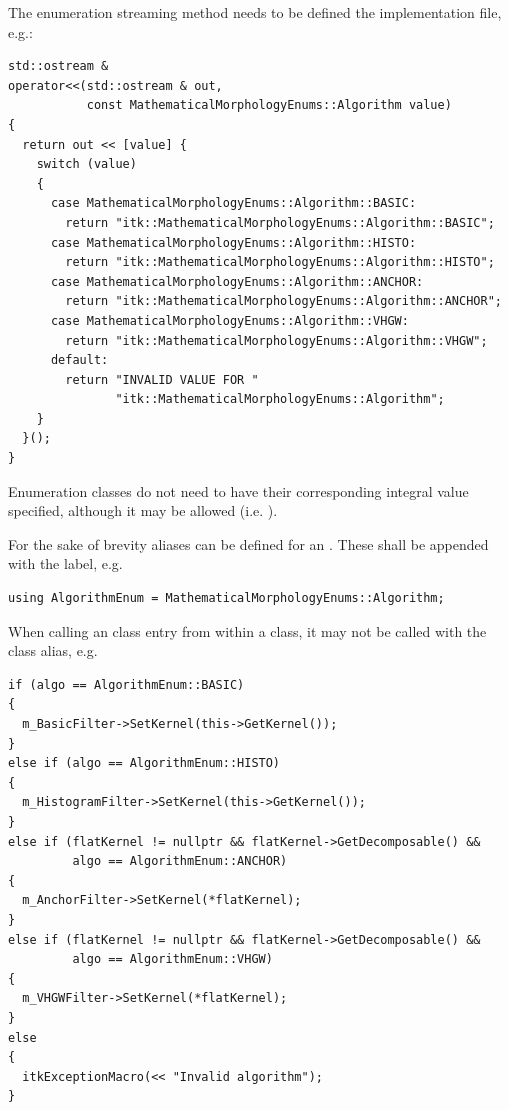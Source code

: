The enumeration streaming method needs to be defined the implementation file, e.g.:
\small
\begin{verbatim}
std::ostream &
operator<<(std::ostream & out,
           const MathematicalMorphologyEnums::Algorithm value)
{
  return out << [value] {
    switch (value)
    {
      case MathematicalMorphologyEnums::Algorithm::BASIC:
        return "itk::MathematicalMorphologyEnums::Algorithm::BASIC";
      case MathematicalMorphologyEnums::Algorithm::HISTO:
        return "itk::MathematicalMorphologyEnums::Algorithm::HISTO";
      case MathematicalMorphologyEnums::Algorithm::ANCHOR:
        return "itk::MathematicalMorphologyEnums::Algorithm::ANCHOR";
      case MathematicalMorphologyEnums::Algorithm::VHGW:
        return "itk::MathematicalMorphologyEnums::Algorithm::VHGW";
      default:
        return "INVALID VALUE FOR "
               "itk::MathematicalMorphologyEnums::Algorithm";
    }
  }();
}
\end{verbatim}
\normalsize

Enumeration classes do not need to have their corresponding integral value
specified, although it may be allowed (i.e. ).

For the sake of brevity aliases can be defined for an . These
shall be appended with the  label, e.g.
\small
\begin{verbatim}
using AlgorithmEnum = MathematicalMorphologyEnums::Algorithm;
\end{verbatim}
\normalsize

When calling an  class entry from within a class, it may not be called with
the  class alias, e.g.
\small
\begin{verbatim}
if (algo == AlgorithmEnum::BASIC)
{
  m_BasicFilter->SetKernel(this->GetKernel());
}
else if (algo == AlgorithmEnum::HISTO)
{
  m_HistogramFilter->SetKernel(this->GetKernel());
}
else if (flatKernel != nullptr && flatKernel->GetDecomposable() &&
         algo == AlgorithmEnum::ANCHOR)
{
  m_AnchorFilter->SetKernel(*flatKernel);
}
else if (flatKernel != nullptr && flatKernel->GetDecomposable() &&
         algo == AlgorithmEnum::VHGW)
{
  m_VHGWFilter->SetKernel(*flatKernel);
}
else
{
  itkExceptionMacro(<< "Invalid algorithm");
}
\end{verbatim}
\normalsize


